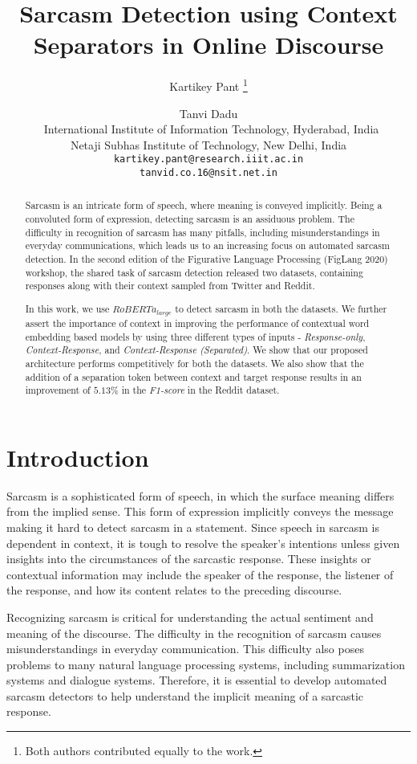 \documentclass[11pt,a4paper]{article}
\title{Sarcasm Detection using Context Separators in Online Discourse}
\author{
    Kartikey Pant \thanks{\hspace{2 mm} Both authors contributed equally to the work.} \and Tanvi Dadu \footnotemark[1] \\\
    International Institute of Information Technology, Hyderabad, India \\
    Netaji Subhas Institute of Technology, New Delhi, India \\
    {\tt kartikey.pant@research.iiit.ac.in} \\
    {\tt tanvid.co.16@nsit.net.in} \\
}
\date{}
\begin{document}
\maketitle
\begin{abstract}
Sarcasm is an intricate form of speech, where meaning is conveyed implicitly. Being a convoluted form of expression, detecting sarcasm is an assiduous problem. The difficulty in recognition of sarcasm has many pitfalls, including misunderstandings in everyday communications, which leads us to an increasing focus on automated sarcasm detection. In the second edition of the Figurative Language Processing (FigLang 2020) workshop, the shared task of sarcasm detection released two datasets, containing responses along with their context sampled from Twitter and Reddit. 

In this work, we use $RoBERTa_{large}$ to detect sarcasm in both the datasets. We further assert the importance of context in improving the performance of contextual word embedding based models by using three different types of inputs - \textit{Response-only}, \textit{Context-Response}, and \textit{Context-Response (Separated)}. We show that our proposed architecture performs competitively for both the datasets. We also show that the addition of a separation token between context and target response results in an improvement of $5.13\%$ in the \textit{F1-score} in the Reddit dataset.

\end{abstract}


\section{Introduction}

Sarcasm is a sophisticated form of speech, in which the surface meaning differs from the implied sense. This form of expression implicitly conveys the message making it hard to detect sarcasm in a statement. Since speech in sarcasm is dependent in context, it is tough to resolve the speaker’s intentions unless given insights into the circumstances of the sarcastic response. These insights or contextual information may include the speaker of the response, the listener of the response, and how its content relates to the preceding discourse.

Recognizing sarcasm is critical for understanding the actual sentiment and meaning of the discourse. The difficulty in the recognition of sarcasm causes misunderstandings in everyday communication. This difficulty also poses problems to many natural language processing systems, including summarization systems and dialogue systems. Therefore, it is essential to develop automated sarcasm detectors to help understand the implicit meaning of a sarcastic response.
\end{document}
